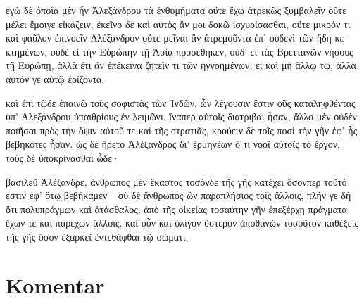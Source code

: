 {\large

\begin{greek}

\noindent  ἐγὼ δὲ ὁποῖα μὲν ἦν Ἀλεξάνδρου τὰ ἐνθυμήματα οὔτε ἔχω ἀτρεκῶς ξυμβαλεῖν οὔτε μέλει ἔμοιγε εἰκάζειν, ἐκεῖνο δὲ καὶ αὐτὸς ἄν μοι δοκῶ ἰσχυρίσασθαι, οὔτε μικρόν τι καὶ φαῦλον ἐπινοεῖν Ἀλέξανδρον οὔτε μεῖναι ἂν ἀτρεμοῦντα ἐπ' οὐδενὶ τῶν ἤδη κεκτημένων, οὐδὲ εἰ τὴν Εὐρώπην τῇ Ἀσίᾳ προσέθηκεν, οὐδ' εἰ τὰς Βρεττανῶν νήσους τῇ Εὐρώπῃ, ἀλλὰ ἔτι ἂν ἐπέκεινα ζητεῖν τι τῶν ἠγνοημένων, εἰ καὶ μὴ ἄλλῳ τῳ, ἀλλὰ αὐτόν γε αὑτῷ ἐρίζοντα.

καὶ ἐπὶ τῷδε ἐπαινῶ τοὺς σοφιστὰς τῶν Ἰνδῶν, ὧν λέγουσιν ἔστιν οὓς καταληφθέντας ὑπ' Ἀλεξάνδρου ὑπαιθρίους ἐν λειμῶνι, ἵναπερ αὐτοῖς διατριβαὶ ἦσαν, ἄλλο μὲν οὐδὲν ποιῆσαι πρὸς τὴν ὄψιν αὐτοῦ τε καὶ τῆς στρατιᾶς, κρούειν δὲ τοῖς ποσὶ τὴν γῆν ἐφ' ἧς βεβηκότες ἦσαν. ὡς δὲ ἤρετο Ἀλέξανδρος δι' ἑρμηνέων ὅ τι νοοῖ αὐτοῖς τὸ ἔργον, τοὺς δὲ ὑποκρίνασθαι ὧδε·

βασιλεῦ Ἀλέξανδρε, ἄνθρωπος μὲν ἕκαστος τοσόνδε τῆς γῆς κατέχει ὅσονπερ τοῦτό ἐστιν ἐφ' ὅτῳ βεβήκαμεν· σὺ δὲ ἄνθρωπος ὢν παραπλήσιος τοῖς ἄλλοις, πλήν γε δὴ ὅτι πολυπράγμων καὶ ἀτάσθαλος, ἀπὸ τῆς οἰκείας τοσαύτην γῆν ἐπεξέρχῃ πράγματα ἔχων τε καὶ παρέχων ἄλλοις. καὶ οὖν καὶ ὀλίγον ὕστερον ἀποθανὼν τοσοῦτον καθέξεις τῆς γῆς ὅσον ἐξαρκεῖ ἐντεθάφθαι τῷ σώματι.

\end{greek}

}


\section*{Komentar}


